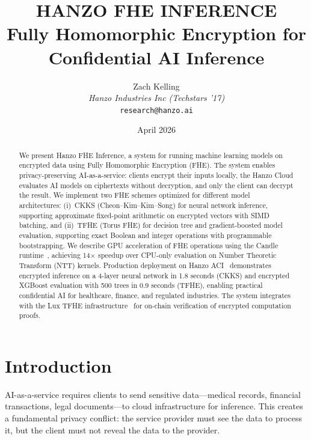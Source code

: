 \documentclass[11pt]{article}
\title{HANZO FHE INFERENCE\\[0.3em]
{\large Fully Homomorphic Encryption for\\Confidential AI Inference}}
\author{
    Zach Kelling \\
    \textit{Hanzo Industries Inc (Techstars '17)} \\
    \texttt{research@hanzo.ai}
}
\date{April 2026}
\begin{document}
\hanzocoverpage

\begin{abstract}
We present Hanzo FHE Inference, a system for running machine learning models on
encrypted data using Fully Homomorphic Encryption (FHE). The system enables
privacy-preserving AI-as-a-service: clients encrypt their inputs locally, the
Hanzo Cloud evaluates AI models on ciphertexts without decryption, and only the
client can decrypt the result. We implement two FHE schemes optimized for
different model architectures: (i)~CKKS (Cheon--Kim--Kim--Song) for neural
network inference, supporting approximate fixed-point arithmetic on encrypted
vectors with SIMD batching, and (ii)~TFHE (Torus FHE) for decision tree and
gradient-boosted model evaluation, supporting exact Boolean and integer
operations with programmable bootstrapping. We describe GPU acceleration of FHE
operations using the Candle runtime~\cite{hanzocandle}, achieving 14$\times$
speedup over CPU-only evaluation on Number Theoretic Transform (NTT) kernels.
Production deployment on Hanzo ACI~\cite{hanzoaci} demonstrates encrypted
inference on a 4-layer neural network in 1.8 seconds (CKKS) and encrypted
XGBoost evaluation with 500 trees in 0.9 seconds (TFHE), enabling practical
confidential AI for healthcare, finance, and regulated industries. The system
integrates with the Lux TFHE infrastructure~\cite{luxtfhe} for on-chain
verification of encrypted computation proofs.
\end{abstract}

\section{Introduction}
\label{sec:intro}

AI-as-a-service requires clients to send sensitive data---medical records,
financial transactions, legal documents---to cloud infrastructure for inference.
This creates a fundamental privacy conflict: the service provider must see the
data to process it, but the client must not reveal the data to the provider.
\end{document}
